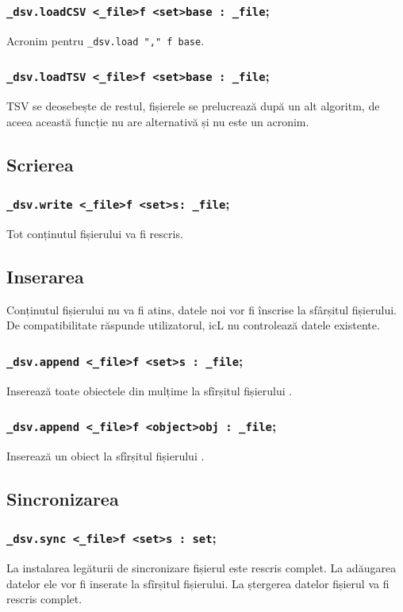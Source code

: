\subsubsection{\lstinline|_dsv.loadCSV <_file>f <set>base : _file|;}

Acronim pentru \lstinline|_dsv.load "," f base|.

\subsubsection{\lstinline|_dsv.loadTSV <_file>f <set>base : _file|;}

TSV se deosebește de restul, fișierele se prelucrează după un alt algoritm, de aceea această funcție nu are alternativă și nu este un acronim.

\subsection{Scrierea}

\subsubsection{\lstinline|_dsv.write <_file>f <set>s: _file|;}

Tot conținutul fișierului va fi rescris.

\subsection{Inserarea}

Conținutul fișierului nu va fi atins, datele noi vor fi înscrise la sfârșitul fișierului. De compatibilitate răspunde utilizatorul, icL nu controlează datele existente.

\subsubsection{\lstinline|_dsv.append <_file>f <set>s : _file|;}

Inserează toate obiectele din mulțime la sfîrșitul fișierului .

\subsubsection{\lstinline|_dsv.append <_file>f <object>obj : _file|;}

Inserează un obiect la sfîrșitul fișierului .

\subsection{Sincronizarea}

\subsubsection{\lstinline|_dsv.sync <_file>f <set>s : set|;}

La instalarea legăturii de sincronizare fișierul este rescris complet. La adăugarea datelor ele vor fi inserate la sfîrșitul fișierului. La ștergerea datelor fișierul va fi rescris complet.

